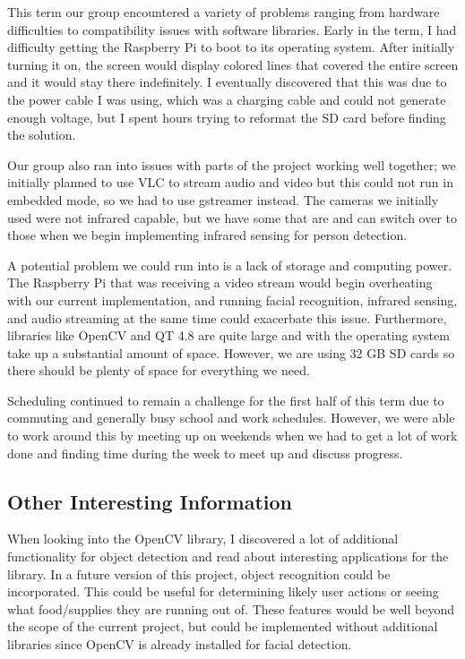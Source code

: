 \documentclass[onecolumn, draftclsnofoot,10pt, compsoc]{IEEEtran}
\begin{document}
This term our group encountered a variety of problems ranging from hardware difficulties to compatibility issues with software libraries. Early in the term, I had difficulty getting the Raspberry Pi to boot to its operating system. After initially turning it on, the screen would display colored lines that covered the entire screen and it would stay there indefinitely. I eventually discovered that this was due to the power cable I was using, which was a charging cable and could not generate enough voltage, but I spent hours trying to reformat the SD card before finding the solution. 

Our group also ran into issues with parts of the project working well together; we initially planned to use VLC to stream audio and video but this could not run in embedded mode, so we had to use gstreamer instead. The cameras we initially used were not infrared capable, but we have some that are and can switch over to those when we begin implementing infrared sensing for person detection. 

A potential problem we could run into is a lack of storage and computing power. The Raspberry Pi that was receiving a video stream would begin overheating with our current implementation, and running facial recognition, infrared sensing, and audio streaming at the same time could exacerbate this issue. Furthermore, libraries like OpenCV and QT 4.8 are quite large and with the operating system take up a substantial amount of space. However, we are using 32 GB SD cards so there should be plenty of space for everything we need.  

Scheduling continued to remain a challenge for the first half of this term due to commuting and generally busy school and work schedules. However, we were able to work around this by meeting up on weekends when we had to get a lot of work done and finding time during the week to meet up and discuss progress. 

\subsection{Other Interesting Information}

When looking into the OpenCV library, I discovered a lot of additional functionality for object detection and read about interesting applications for the library. In a future version of this project, object recognition could be incorporated. This could be useful for determining likely user actions or seeing what food/supplies they are running out of. These features would be well beyond the scope of the current project, but could be implemented without additional libraries since OpenCV is already installed for facial detection. 
\end{document}

